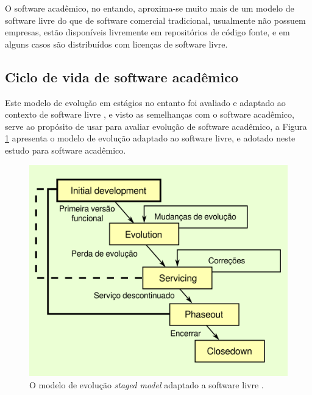 

O software acadêmico, no entando, aproxima-se muito mais de um modelo de
software livre do que de software comercial tradicional, usualmente não possuem
empresas, estão disponíveis livremente em repositórios de código fonte, e em
alguns casos são distribuídos com licenças de software livre.

\subsection{Ciclo de vida de software acadêmico}

Este modelo de evolução em estágios no entanto foi avaliado e adaptado
ao contexto de software livre \cite{capiluppi2007adapting}, e visto as
semelhanças com o software acadêmico, serve ao propósito de usar para
avaliar evolução de software acadêmico, a Figura \ref{staged-model-foss-cycle}
apresenta o modelo de evolução adaptado ao software livre, e adotado
neste estudo para software acadêmico.

\begin{figure}[h]
  \center
  \includegraphics[scale=0.6]{imagens/staged-model-foss-cycle.png}
  \caption{O modelo de evolução {\it staged model} adaptado a software livre \cite{capiluppi2007adapting}.}
  \label{staged-model-foss-cycle}
\end{figure}


